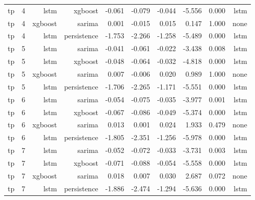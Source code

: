 \begin{table}[t]
\begin{tabular}{llrrrrrrrr}
tp & 4 & lstm & xgboost & -0.061 & -0.079 & -0.044 & -5.556 & 0.000 & lstm \\
tp & 4 & xgboost & sarima & 0.001 & -0.015 & 0.015 & 0.147 & 1.000 & none \\
tp & 4 & lstm & persistence & -1.753 & -2.266 & -1.258 & -5.489 & 0.000 & lstm \\
tp & 5 & lstm & sarima & -0.041 & -0.061 & -0.022 & -3.438 & 0.008 & lstm \\
tp & 5 & lstm & xgboost & -0.048 & -0.064 & -0.032 & -4.818 & 0.000 & lstm \\
tp & 5 & xgboost & sarima & 0.007 & -0.006 & 0.020 & 0.989 & 1.000 & none \\
tp & 5 & lstm & persistence & -1.706 & -2.265 & -1.171 & -5.551 & 0.000 & lstm \\
tp & 6 & lstm & sarima & -0.054 & -0.075 & -0.035 & -3.977 & 0.001 & lstm \\
tp & 6 & lstm & xgboost & -0.067 & -0.086 & -0.049 & -5.374 & 0.000 & lstm \\
tp & 6 & xgboost & sarima & 0.013 & 0.001 & 0.024 & 1.933 & 0.479 & none \\
tp & 6 & lstm & persistence & -1.805 & -2.351 & -1.256 & -5.978 & 0.000 & lstm \\
tp & 7 & lstm & sarima & -0.052 & -0.072 & -0.033 & -3.731 & 0.003 & lstm \\
tp & 7 & lstm & xgboost & -0.071 & -0.088 & -0.054 & -5.558 & 0.000 & lstm \\
tp & 7 & xgboost & sarima & 0.018 & 0.007 & 0.030 & 2.687 & 0.072 & none \\
tp & 7 & lstm & persistence & -1.886 & -2.474 & -1.294 & -5.636 & 0.000 & lstm \\
\bottomrule
\end{tabular}
\end{table}